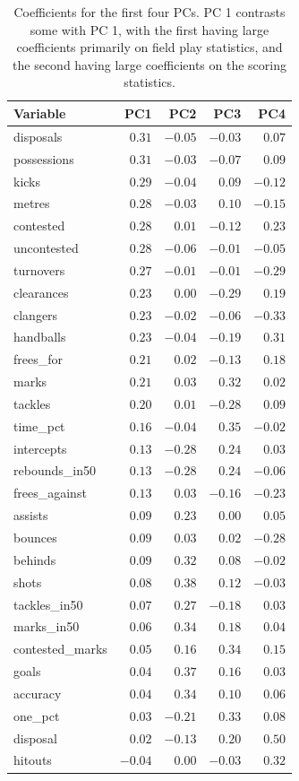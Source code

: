 \documentclass[
  letterpaper,
]{krantz}
\begin{document}
\begin{longtable}{lrrrr}

\caption{\label{tbl-aflw-pcs}Coefficients for the first four PCs. PC 1
contrasts some with PC 1, with the first having large coefficients
primarily on field play statistics, and the second having large
coefficients on the scoring statistics.}

\tabularnewline

\toprule
Variable & PC1 & PC2 & PC3 & PC4 \\ 
\midrule\addlinespace[2.5pt]
disposals & $0.31$ & $-0.05$ & $-0.03$ & $0.07$ \\ 
possessions & $0.31$ & $-0.03$ & $-0.07$ & $0.09$ \\ 
kicks & $0.29$ & $-0.04$ & $0.09$ & $-0.12$ \\ 
metres & $0.28$ & $-0.03$ & $0.10$ & $-0.15$ \\ 
contested & $0.28$ & $0.01$ & $-0.12$ & $0.23$ \\ 
uncontested & $0.28$ & $-0.06$ & $-0.01$ & $-0.05$ \\ 
turnovers & $0.27$ & $-0.01$ & $-0.01$ & $-0.29$ \\ 
clearances & $0.23$ & $0.00$ & $-0.29$ & $0.19$ \\ 
clangers & $0.23$ & $-0.02$ & $-0.06$ & $-0.33$ \\ 
handballs & $0.23$ & $-0.04$ & $-0.19$ & $0.31$ \\ 
frees\_for & $0.21$ & $0.02$ & $-0.13$ & $0.18$ \\ 
marks & $0.21$ & $0.03$ & $0.32$ & $0.02$ \\ 
tackles & $0.20$ & $0.01$ & $-0.28$ & $0.09$ \\ 
time\_pct & $0.16$ & $-0.04$ & $0.35$ & $-0.02$ \\ 
intercepts & $0.13$ & $-0.28$ & $0.24$ & $0.03$ \\ 
rebounds\_in50 & $0.13$ & $-0.28$ & $0.24$ & $-0.06$ \\ 
frees\_against & $0.13$ & $0.03$ & $-0.16$ & $-0.23$ \\ 
assists & $0.09$ & $0.23$ & $0.00$ & $0.05$ \\ 
bounces & $0.09$ & $0.03$ & $0.02$ & $-0.28$ \\ 
behinds & $0.09$ & $0.32$ & $0.08$ & $-0.02$ \\ 
shots & $0.08$ & $0.38$ & $0.12$ & $-0.03$ \\ 
tackles\_in50 & $0.07$ & $0.27$ & $-0.18$ & $0.03$ \\ 
marks\_in50 & $0.06$ & $0.34$ & $0.18$ & $0.04$ \\ 
contested\_marks & $0.05$ & $0.16$ & $0.34$ & $0.15$ \\ 
goals & $0.04$ & $0.37$ & $0.16$ & $0.03$ \\ 
accuracy & $0.04$ & $0.34$ & $0.10$ & $0.06$ \\ 
one\_pct & $0.03$ & $-0.21$ & $0.33$ & $0.08$ \\ 
disposal & $0.02$ & $-0.13$ & $0.20$ & $0.50$ \\ 
hitouts & $-0.04$ & $0.00$ & $-0.03$ & $0.32$ \\ 
\bottomrule

\end{longtable}
\end{document}
